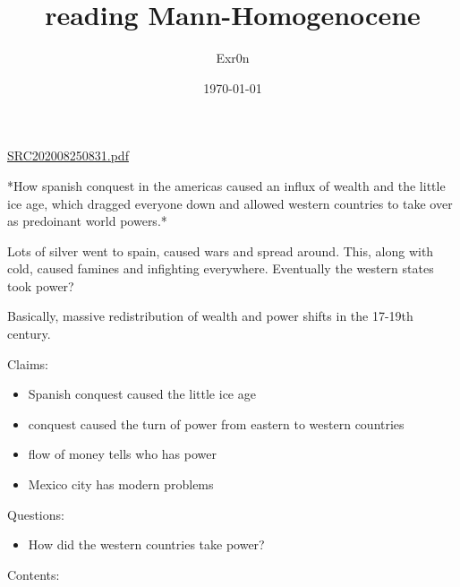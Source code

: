 \documentclass[letterpaper]{article}
\author{Exr0n}
\date{\today}
\title{reading Mann-Homogenocene}
\renewcommand\maketitle{}
\begin{document}
\maketitle
\href{SRC202008250831.pdf.org}{SRC202008250831.pdf}

*How spanish conquest in the americas caused an influx of wealth and the
little ice age, which dragged everyone down and allowed western
countries to take over as predoinant world powers.*

Lots of silver went to spain, caused wars and spread around. This, along
with cold, caused famines and infighting everywhere. Eventually the
western states took power?

Basically, massive redistribution of wealth and power shifts in the
17-19th century.

Claims:

\begin{itemize}
\item Spanish conquest caused the little ice age
\item conquest caused the turn of power from eastern to western countries
\item flow of money tells who has power
\item Mexico city has modern problems
\end{itemize}

Questions:

\begin{itemize}
\item How did the western countries take power?
\end{itemize}

Contents:
\end{document}
